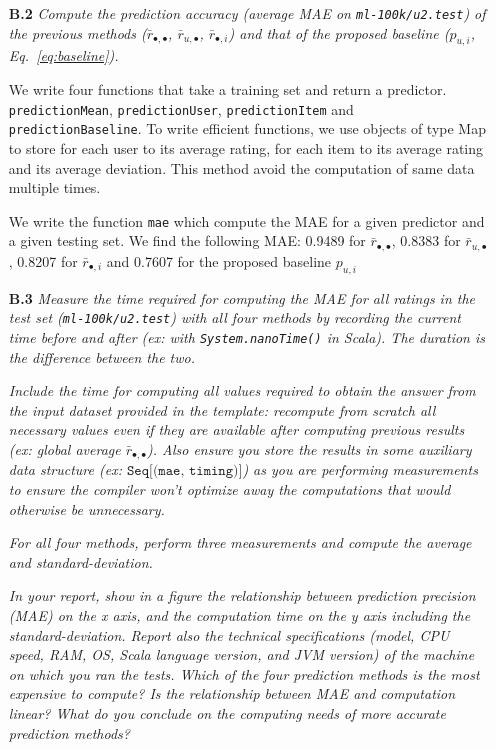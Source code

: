 \documentclass{article}
\begin{document}
\begin{itemize}
    \item [\textbf{B.2}] \textit{Compute the prediction accuracy (average MAE on \texttt{ml-100k/u2.test}) of the previous methods ($\bar r_{\bullet, \bullet}$, $\bar r_{u,\bullet}$, $\bar r_{\bullet,i}$) and that of the proposed baseline ($p_{u,i}$, Eq.~\ref{eq:baseline}). }
    
    We write four functions that take a training set and return a predictor. \texttt{predictionMean}, \texttt{predictionUser}, \texttt{predictionItem} and \texttt{predictionBaseline}. To write efficient functions, we use objects of type Map to store for each user to its average rating, for each item to its average rating and its average deviation. This method avoid the computation of same data multiple times. 
    
    We write the function \texttt{mae} which compute the MAE for a given predictor and a given testing set. We find the following MAE: 0.9489 for $\bar r_{\bullet, \bullet}$, 0.8383 for $\bar r_{u,\bullet}$, 0.8207 for $\bar r_{\bullet,i}$ and 0.7607 for the proposed baseline $p_{u,i}$

  \item [\textbf{B.3}] \textit{Measure the time required for computing the MAE for all ratings in the test set (\texttt{ml-100k/u2.test}) with all four methods by recording the current time before and after (ex: with \texttt{System.nanoTime()} in Scala). The duration is the difference between the two. } 
 
 \textit{ 
Include the time for computing all values required to obtain the answer from the input dataset provided in the template: recompute from scratch all necessary values even if they are available after computing previous results (ex: global average $\bar r_{\bullet, \bullet}$). Also ensure you store the results in some auxiliary data structure (ex: $\texttt{Seq[(mae, timing)]}$) as you are performing measurements to ensure the compiler won't optimize away the computations that would otherwise be unnecessary.}

\textit{
 For all four methods, perform three measurements and compute the average and standard-deviation.}
 
 \textit{In your report, show in a figure the relationship between prediction precision (MAE) on the x axis, and the computation time on the y axis including the standard-deviation. Report also the technical specifications (model, CPU speed, RAM, OS, Scala language version, and JVM version) of the machine on which you ran the tests. Which of the four prediction methods is the most expensive to compute? Is the relationship between MAE and computation linear? What do you conclude on the computing needs of more accurate prediction methods?}
 

\end{itemize}
\end{document}
